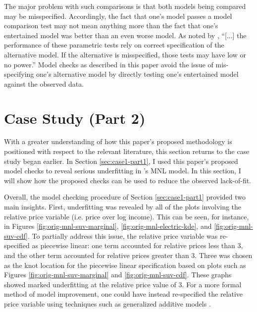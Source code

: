\documentclass[preprint]{elsarticle}
\begin{document}
The major problem with such comparisons is that both models being compared may be misspecified. Accordingly, the fact that one's model passes a model comparison test may not mean anything more than the fact that one's entertained model was better than an even worse model. As noted by \citet{zheng_testing_2008}, ``[...] the performance of these parametric tests rely on correct specification of the alternative model. If the alternative is misspecified, those tests may have low or no power.'' Model checks as described in this paper avoid the issue of mis-specifying one's alternative model by directly testing one's entertained model against the observed data.

\section{Case Study (Part 2)}
\label{sec:case-study-part2}
With a greater understanding of how this paper's proposed methodology is positioned with respect to the relevant literature, this section returns to the case study began earlier. In Section \ref{sec:case1-part1}, I used this paper's proposed model checks to reveal serious underfitting in \citeauthor{brownstone_forecasting_1998}'s MNL model. In this section, I will show how the proposed checks can be used to reduce the observed lack-of-fit.

Overall, the model checking procedure of Section \ref{sec:case1-part1} provided two main insights. First, underfitting was revealed by all of the plots involving the relative price variable (i.e. price over log income). This can be seen, for instance, in Figures \ref{fig:orig-mnl-suv-marginal}, \ref{fig:orig-mnl-electric-kde}, and \ref{fig:orig-mnl-suv-cdf}. To partially address this issue, the relative price variable was re-specified as piecewise linear: one term accounted for relative prices less than 3, and the other term accounted for relative prices greater than 3. Three was chosen as the knot location for the piecewise linear specification based on plots such as Figures \ref{fig:orig-mnl-suv-marginal} and \ref{fig:orig-mnl-suv-cdf}. These graphs showed marked underfitting at the relative price value of 3. For a more formal method of model improvement, one could have instead re-specified the relative price variable using techniques such as generalized additive models \citep{hastie_generalized_1986, abe_generalized_1999}.
\end{document}

